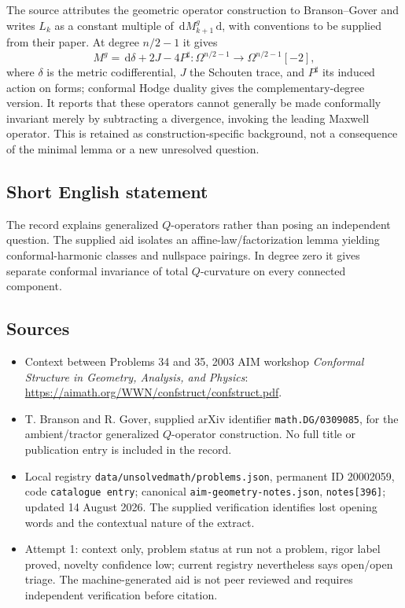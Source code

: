 \documentclass[11pt]{article}
\newcommand{\dd}{\,\mathrm{d}}
\begin{document}
The source attributes the geometric operator construction to Branson--Gover and writes \(L_k\) as a constant multiple of \(\dd M_{k+1}^g\dd\), with conventions to be supplied from their paper. At degree \(n/2-1\) it gives
\[
M^g=\dd\delta+2J-4P^{\sharp}:
\Omega^{n/2-1}\longrightarrow\Omega^{n/2-1}[-2],
\]
where \(\delta\) is the metric codifferential, \(J\) the Schouten trace, and \(P^{\sharp}\) its induced action on forms; conformal Hodge duality gives the complementary-degree version. It reports that these operators cannot generally be made conformally invariant merely by subtracting a divergence, invoking the leading Maxwell operator. This is retained as construction-specific background, not a consequence of the minimal lemma or a new unresolved question.
\subsection{Short English statement}
The record explains generalized \(Q\)-operators rather than posing an independent question. The supplied aid isolates an affine-law/factorization lemma yielding conformal-harmonic classes and nullspace pairings. In degree zero it gives separate conformal invariance of total \(Q\)-curvature on every connected component.
\subsection{Sources}
\begin{itemize}
\item Context between Problems 34 and 35, 2003 AIM workshop \emph{Conformal Structure in Geometry, Analysis, and Physics}: \url{https://aimath.org/WWN/confstruct/confstruct.pdf}.
\item T. Branson and R. Gover, supplied arXiv identifier \texttt{math.DG/0309085}, for the ambient/tractor generalized \(Q\)-operator construction. No full title or publication entry is included in the record.
\item Local registry \texttt{data/unsolvedmath/problems.json}, permanent ID 20002059, code \texttt{catalogue entry}; canonical \texttt{aim-geometry-notes.json}, \texttt{notes[396]}; updated 14 August 2026. The supplied verification identifies lost opening words and the contextual nature of the extract.
\item Attempt 1: context only, problem status at run not a problem, rigor label proved, novelty confidence low; current registry nevertheless says open/open triage. The machine-generated aid is not peer reviewed and requires independent verification before citation.
\end{itemize}
\end{document}
